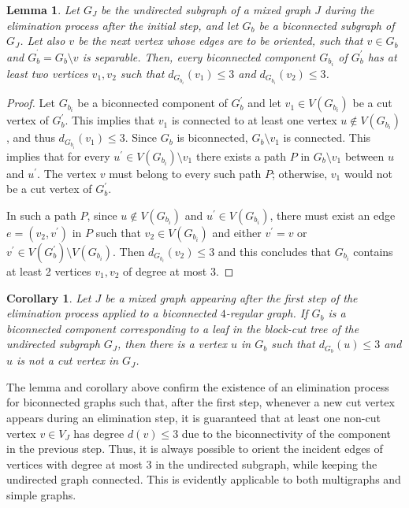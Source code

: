 \documentclass{article}
\newtheorem{lemma}{Lemma}
\newtheorem{corollary}{Corollary}
\begin{document}
        
        \begin{lemma}\label{lem:bi3}
            Let $G_J$ be the undirected subgraph of a mixed graph $J$ during the elimination process after the initial step, and let $G_b$ be a biconnected subgraph of $G_J$.
            Let also $v$ be the next vertex whose edges are to be oriented, such that $v\in G_b$ and $G_{b}^{^\prime}=G_b\setminus v$ is separable.
            Then, every biconnected component $G_{b_i}$ of $G_{b}^{\prime}$ has at least two vertices $v_1, v_2$ such that $d_{G_{b_i}}(v_1) \leq 3$ and $d_{G_{b_i}}(v_2) \leq 3$. 
        \end{lemma}
        
        \begin{proof}
        Let $G_{b_i}$ be a biconnected component of $G_{b}^{\prime}$ and let $v_1\in V(G_{b_i})$ be a cut vertex of $G_{b}^{\prime}$.
        This implies that $v_1$ is connected to at least one vertex $u \notin V(G_{b_i})$, and thus $d_{G_{b_i}}(v_1)\leq 3$.
        Since $G_b$ is biconnected,  $G_b\setminus v_1$ is connected. This implies that  for every $u^\prime\in V(G_{b_i})\setminus v_1$ there exists a path $P$ in $G_b\setminus v_1$ between $u$ and $u^\prime$.
        The vertex $v$ must belong to every such path $P$; otherwise, $v_1$ would not be a cut vertex of $G_{b}^{\prime}$.
        
        In such a path $P$, since $u\notin V(G_{b_i})$ and $u^\prime\in V(G_{b_i})$, there must exist an edge $e=(v_2,v^{\prime})$ in $P$ such that $v_2\in V(G_{b_i})$ and either $v^{\prime}=v$ or $v^{\prime}\in V(G_{b}^{\prime})\setminus V(G_{b_i})$.
        Then $d_{G_{b_i}}(v_2)\leq 3$ and this concludes that $G_{b_i}$ contains at least 2 vertices $v_1, v_2$ of degree at most 3.
        
        \end{proof}
        
        \begin{corollary}\label{cor:bi}
        Let $J$ be a mixed graph appearing after the first step of the elimination process applied to a biconnected $4$-regular graph.
        If $G_b$ is a biconnected component corresponding to a leaf in the block-cut tree of the undirected subgraph $G_J$, then there is a vertex $u$ in $G_b$ such that $d_{G_b}(u)\leq 3$ and $u$ is not a cut vertex in $G_J$.
        \end{corollary}
        
        The lemma and corollary above confirm the existence of an elimination process for biconnected graphs such that, after the first step, whenever a new cut vertex appears during an elimination step, it is guaranteed that at least one non-cut vertex $v\in V_J$ has degree $d(v) \leq 3$ due to the biconnectivity of the component in the previous step.
        Thus, it is always possible to orient the incident edges of vertices with degree at most $3$ in the undirected subgraph, while keeping the undirected graph connected.
        This is evidently applicable to both multigraphs and simple graphs.
\end{document}
